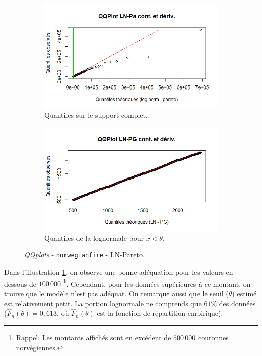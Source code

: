 		\begin{figure}[H]
			\begin{center}
				\begin{subfigure}[b]{0.45\textwidth}
					\includegraphics[scale=0.54]{Graphiques/QQ_LN_Pa_cont_dev} 
					\caption{Quantiles sur le support complet.} \label{QQplot_LN_Pa_conde}
				\end{subfigure}
				\begin{subfigure}[b]{0.40\textwidth}
					\includegraphics[scale=0.54]{Graphiques/QQ_LN_PA_contdiv_t1} 
					\caption{Quantiles de la lognormale pour $x<\theta$.} \label{QQplot_LN_Pa_conde_2}
				\end{subfigure}
				\renewcommand{\figurename}{Illustration}
				\caption{\textit{QQplots} - \texttt{norwegianfire} - LN-Pareto.}
			\end{center}
		\end{figure}
	
		Dans l'illustration \ref{QQplot_LN_Pa_conde}, on observe une bonne adéquation pour les valeurs en dessous de $100\,000$ \footnote{Rappel: Les montants affichés sont en excédent de $500\,000$ couronnes norvégiennes.}. Cependant, pour les données supérieures à ce montant, on trouve que le modèle n'est pas adéquat.  On remarque aussi que le seuil ($\theta$) estimé est relativement petit. La portion lognormale ne comprends que $61\%$ des données ($\hat{F}_n(\theta) = 0,613$, où $\hat{F}_n(\theta)$ est la fonction de répartition empirique). \\
		
